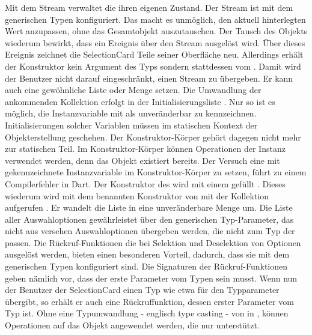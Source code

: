 Mit dem Stream  verwaltet die  ihren eigenen Zustand.
Der Stream ist mit dem generischen Typen  konfiguriert.
Das macht es unmöglich, den aktuell hinterlegten Wert anzupassen, ohne das Gesamtobjekt auszutauschen.
Der Tausch des Objekts wiederum bewirkt, dass ein Ereignis über den Stream ausgelöst wird. Über dieses Ereignis zeichnet die SelectionCard Teile seiner Oberfläche neu. Allerdings erhält der Konstruktor kein Argument des Typs  sondern stattdessen vom  . Damit wird der Benutzer nicht darauf eingeschränkt, einen Stream zu übergeben. Er kann auch eine gewöhnliche Liste oder Menge setzen. Die Umwandlung der ankommenden Kollektion erfolgt in der Initialisierungsliste . Nur so ist es möglich, die Instanzvariable mit  als unveränderbar zu kennzeichnen. Initialisierungen solcher Variablen müssen im statischen Kontext der Objekterstellung geschehen. Der Konstruktor-Körper gehört dagegen nicht mehr zur statischen Teil. Im Konstruktor-Körper können Operationen der Instanz verwendet werden, denn das Objekt existiert bereits. Der Versuch eine mit  gekennzeichnete Instanzvariable im Konstruktor-Körper zu setzen, führt zu einem Compilerfehler in Dart. Der Konstruktor  des  wird mit einem  gefüllt . Dieses wiederum wird mit dem benannten Konstruktor  von  mit der Kollektion aufgerufen . Er wandelt die  Liste in eine unveränderbare Menge um. Die Liste aller Auswahloptionen   gewährleistet über den generischen Typ-Parameter, das nicht aus versehen Auswahloptionen übergeben werden, die nicht zum Typ der  passen. Die Rückruf-Funktionen  die bei Selektion und Deselektion von Optionen ausgelöst werden, bieten einen besonderen Vorteil, dadurch, dass sie mit dem generischen Typen konfiguriert sind. Die Signaturen der Rückruf-Funktionen  geben nämlich vor, dass der erste Parameter vom Typen  sein musst. Wenn nun der Benutzer der SelectionCard einen Typ wie etwa  für den Typparameter übergibt, so erhält er auch eine Rückruffunktion, dessen erster Parameter vom Typ  ist. Ohne eine Typumwandlung - englisch type casting - von  in , können Operationen auf das Objekt angewendet werden, die nur  unterstützt. 

